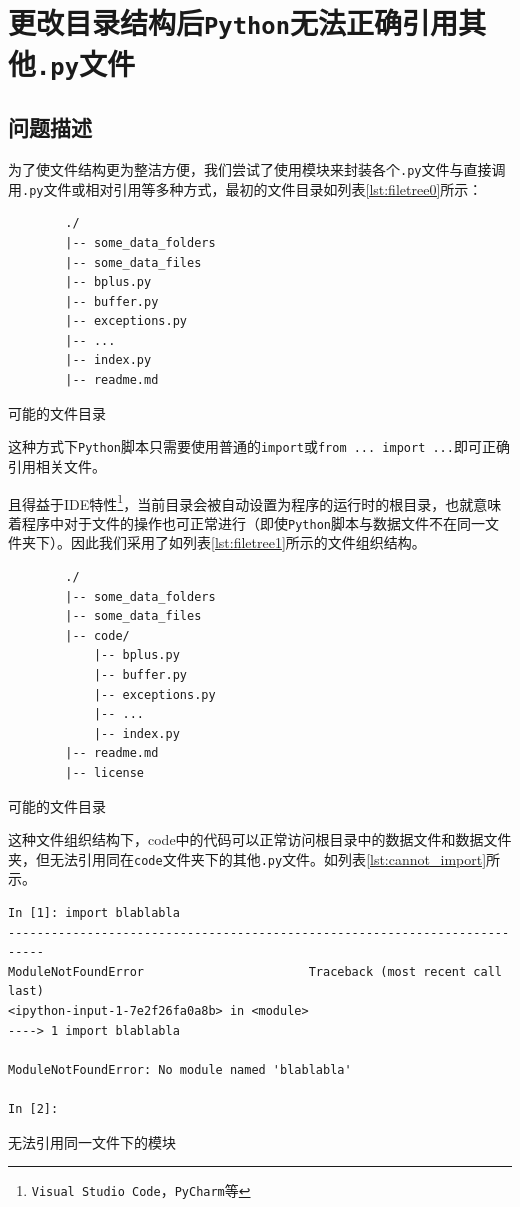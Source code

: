 \documentclass[UTF8]{ctexrep} %
\newenvironment{longlisting}{\captionsetup{type=listing}}{}
\begin{document}
\section{更改目录结构后\texttt{Python}无法正确引用其他\texttt{.py}文件}
\subsection{问题描述}
为了使文件结构更为整洁方便，我们尝试了使用模块来封装各个\texttt{.py}文件与直接调用\texttt{.py}文件或相对引用等多种方式，最初的文件目录如列表\ref{lst:filetree0}所示：
\begin{longlisting}
    \begin{verbatim}
        ./
        |-- some_data_folders
        |-- some_data_files
        |-- bplus.py
        |-- buffer.py
        |-- exceptions.py
        |-- ...
        |-- index.py
        |-- readme.md
    \end{verbatim}
    \caption{可能的文件目录}
    \label{lst:filetree0}
\end{longlisting}
这种方式下\texttt{Python}脚本只需要使用普通的\texttt{import}或\texttt{from ... import ...}即可正确引用相关文件。
\par
且得益于IDE特性\footnote{\texttt{Visual Studio Code}，\texttt{PyCharm}等}，当前目录会被自动设置为程序的运行时的根目录，也就意味着程序中对于文件的操作也可正常进行（即使\texttt{Python}脚本与数据文件不在同一文件夹下）。因此我们采用了如列表\ref{lst:filetree1}所示的文件组织结构。

\begin{longlisting}
    \begin{verbatim}
        ./
        |-- some_data_folders
        |-- some_data_files
        |-- code/
            |-- bplus.py
            |-- buffer.py
            |-- exceptions.py
            |-- ...
            |-- index.py
        |-- readme.md
        |-- license
    \end{verbatim}
    \caption{可能的文件目录}
    \label{lst:filetree1}
\end{longlisting}

这种文件组织结构下，code中的代码可以正常访问根目录中的数据文件和数据文件夹，但无法引用同在\texttt{code}文件夹下的其他\texttt{.py}文件。如列表\ref{lst:cannot_import}所示。
\begin{longlisting}
    \begin{verbatim}
In [1]: import blablabla
---------------------------------------------------------------------------
ModuleNotFoundError                       Traceback (most recent call last)
<ipython-input-1-7e2f26fa0a8b> in <module>
----> 1 import blablabla

ModuleNotFoundError: No module named 'blablabla'

In [2]:
    \end{verbatim}
    \caption{无法引用同一文件下的模块}
    \label{lst:cannot_import}
\end{longlisting}
\end{document}
